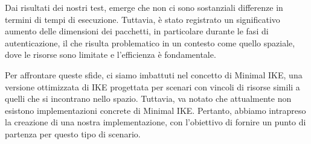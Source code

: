 Dai risultati dei nostri test, emerge che non ci sono sostanziali differenze in
termini di tempi di esecuzione. Tuttavia, è stato registrato un significativo
aumento delle dimensioni dei pacchetti, in particolare durante le fasi di
autenticazione, il che risulta problematico in un contesto come quello spaziale,
dove le risorse sono limitate e l'efficienza è fondamentale.

Per affrontare queste sfide, ci siamo imbattuti nel concetto di Minimal IKE,
una versione ottimizzata di IKE progettata per scenari con vincoli di risorse
simili a quelli che si incontrano nello spazio. Tuttavia, va notato che
attualmente non esistono implementazioni concrete di Minimal IKE\@. Pertanto,
abbiamo intrapreso la creazione di una nostra implementazione, con l'obiettivo
di fornire un punto di partenza per questo tipo di scenario.


